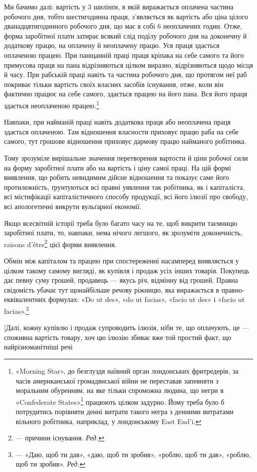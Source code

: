 Ми бачимо далі: вартість у 3 шилінґи, в якій виражається
оплачена частина робочого дня, тобто шестигодинна праця,
з’являється як вартість або ціна цілого дванадцятигодинного
робочого дня, що має в собі 6 неоплачених годин. Отже, форма
заробітної плати затирає всякий слід поділу робочого дня на
доконечну й додаткову працю, на оплачену й неоплачену працю.
Уся праця здається оплаченою працею. При панщанній праці
праця кріпака на себе самого та його примусова праця на пана
відрізняються цілком виразно, відрізняються щодо місця й часу.
При рабській праці навіть та частина робочого дня, що протягом
неї раб покриває тільки вартість своїх власних засобів існування,
отже, коли він фактично працює на себе самого, здається працею
на його пана. Вся його праця здається неоплаченою працею.\footnote{
«Morning Star», до безглуздя наївний орган лондонських фритредерів,
за часів американської громадянської війни не переставав запевняти
з моральним обуренням, на яке тільки спроможна людина, що
негри в «Confederate States»\footnote*{
— південних штатах. \emph{Ред.}
} працюють цілком задурно. Йому треба
було б потрудитись порівняти денні витрати такого негра з денними витратами
вільного робітника, наприклад, у лондонському East End'i.
}

Навпаки, при найманій праці навіть додаткова праця або
неоплачена праця здається оплаченою. Там відношення власности
приховує працю раба на себе самого, тут грошове відношення
приховує дармову працю найманого робітника.

Тому зрозуміле вирішальне значення перетворення вартости
й ціни робочої сили на форму заробітної плати або на вартість
і ціну самої праці. На цій формі виявлення, що робить невидимим
дійсне відношення та показує саме його протилежність,
ґрунтуються всі правні уявлення так робітника, як і капіталіста,
всі містифікації капіталістичного способу продукції, всі
його ілюзії про свободу, всі апологетичні викрути вульґарної
економії.

Якщо всесвітній історії треба було багато часу на те, щоб
викрити таємницю заробітної плати, то, навпаки, нема нічого
легшого, як зрозуміти доконечність, raisons d’être\footnote*{
— причини існування. \emph{Ред.}
} цієї форми
виявлення.

Обмін між капіталом та працею при спостереженні насамперед
виявляється у цілком такому самому вигляді, як купівля
і продаж усіх інших товарів. Покупець дає певну суму грошей,
продавець — якусь річ, відмінну від грошей. Правна свідомість
убачає тут щонайбільше речову ріжницю, яка виражається
в правно-еквівалентних формулах: «Do ut des», «do ut facias»,
«facio ut des» і «facio ut facias».\footnote*{
— «Даю, щоб ти дав», «даю, щоб ти зробив», «роблю, щоб ти дав»,
«роблю, щоб ти зробив». \emph{Ред.}
}

[Далі, кожну купівлю і продаж супроводить ілюзія, ніби
те, що оплачують, це — споживна вартість товару, хоч цю ілюзію
збиває вже той простий факт, що найрізноманітніші речі
\parbreak{}  %
